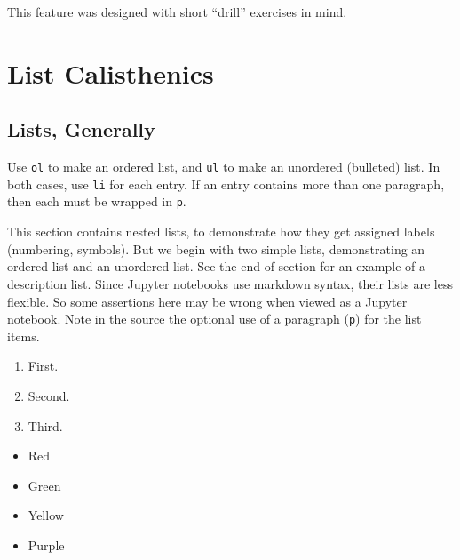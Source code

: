 \documentclass[10pt,]{article}
\theoremstyle{plain}
\theoremstyle{definition}
\theoremstyle{definition}
\theoremstyle{definition}
\theoremstyle{definition}
\theoremstyle{definition}
\theoremstyle{definition}
\numberwithin{equation}{section}
\begin{document}
\hypertarget{p-313}{}%
This feature was designed with short ``drill'' exercises in mind.%
\par\smallskip\noindent
\typeout{************************************************}
\typeout{************************************************}
\section[{List Calisthenics}]{List Calisthenics}\label{section-12}
\typeout{************************************************}
\typeout{************************************************}
\subsection[{Lists, Generally}]{Lists, Generally}\label{subsection-28}
\hypertarget{p-314}{}%
Use \lstinline?ol? to make an ordered list, and \lstinline?ul? to make an unordered (bulleted) list. In both cases, use \lstinline?li? for each entry.  If an entry contains more than one paragraph, then each must be wrapped in \lstinline?p?.   %
\par
\hypertarget{p-315}{}%
This section contains nested lists, to demonstrate how they get assigned labels (numbering, symbols).  But we begin with two simple lists, demonstrating an ordered list and an unordered list.  See the end of section for an example of a description list.  Since Jupyter notebooks use markdown syntax, their lists are less flexible.  So some assertions here may be wrong when viewed as a Jupyter notebook.  Note in the source the optional use of a paragraph (\lstinline?p?) for the list items.%
\par
\hypertarget{p-316}{}%
\leavevmode%
\begin{enumerate}
\item\hypertarget{li-49}{}First.%
\item\hypertarget{li-50}{}Second.%
\item\hypertarget{li-51}{}Third.%
\end{enumerate}
\leavevmode%
\begin{itemize}[label=\textbullet]
\item{}\hypertarget{p-317}{}%
Red%
\item{}\hypertarget{p-318}{}%
Green%
\item{}\hypertarget{p-319}{}%
Yellow%
\item{}\hypertarget{p-320}{}%
Purple%
\end{itemize}
\end{document}

